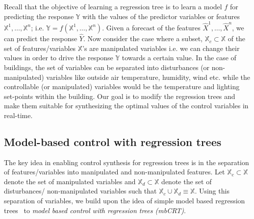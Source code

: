 Recall that the objective of learning a regression tree is to learn a model $f$ for predicting the response $\mathbb{Y}$ with the values of the predictor variables or features $\mathbb{X}^1, \dots, \mathbb{X}^n$; i.e. $\mathbb{Y}=f(\mathbb{X}^1, \dots, \mathbb{X}^n)$.
Given a forecast of the features $\hat{X}^1, \dots, \hat{X}^n$, we can predict the response $\hat{Y}$. 
Now consider the case where a subset, $\mathbb{X}_c \subset \mathbb{X}$ of the set of features/variables $\mathbb{X}$'s are manipulated variables i.e. we can change their values in order to drive the response $\mathbb{Y}$ towards a certain value. 
In the case of buildings, the set of  variables can be separated into disturbances (or non-manipulated) variables like outside air temperature, humidity, wind etc. while the controllable (or manipulated) variables would be the temperature and lighting set-points within the building.
Our goal is to modify the regression trees and make them suitable for synthesizing the optimal values of the control variables in real-time.

\subsection{Model-based control with regression trees}
\label{sec:mbcrt}

The key idea in enabling control synthesis for regression trees is in the separation of features/variables into manipulated and non-manipulated features. 
Let $\mathbb{X}_c \subset \mathbb{X}$ denote the set of manipulated variables and $\mathbb{X}_d \subset \mathbb{X}$ denote the set of disturbances/ non-manipulated variables such that $\mathbb{X}_c \cup \mathbb{X}_d \equiv \mathbb{X}$.
Using this separation of variables, we build upon the idea of simple model based regression trees~\cite{friedman1991multivariate} to \emph{model based control with regression trees (mbCRT)}. 

